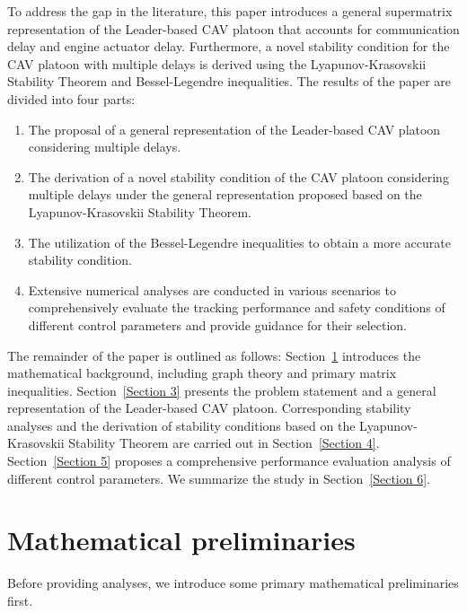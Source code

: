 \documentclass[a4paper]{cas-sc}
\begin{document}
To address the gap in the literature, this paper introduces a general supermatrix representation of the Leader-based CAV platoon that accounts for communication delay and engine actuator delay. Furthermore, a novel stability condition for the CAV platoon with multiple delays is derived using the Lyapunov-Krasovskii Stability Theorem and Bessel-Legendre inequalities. The results of the paper are divided into four parts:
\begin{enumerate}
  \item The proposal of a general representation of the Leader-based CAV platoon considering multiple delays.
  \item The derivation of a novel stability condition of the CAV platoon considering multiple delays under the general representation proposed based on the Lyapunov-Krasovskii Stability Theorem.
  \item The utilization of the Bessel-Legendre inequalities to obtain a more accurate stability condition.
  \item Extensive numerical analyses are conducted in various scenarios to comprehensively evaluate the tracking performance and safety conditions of different control parameters and provide guidance for their selection.
\end{enumerate}

The remainder of the paper is outlined as follows: Section~\ref{Section 2} introduces the mathematical background, including graph theory and primary matrix inequalities. Section~\ref{Section 3} presents the problem statement and a general representation of the Leader-based CAV platoon. Corresponding stability analyses and the derivation of stability conditions based on the Lyapunov-Krasovskii Stability Theorem are carried out in Section~\ref{Section 4}. Section~\ref{Section 5} proposes a comprehensive performance evaluation analysis of different control parameters. We summarize the study in Section~\ref{Section 6}.




\section{Mathematical preliminaries}
\label{Section 2}
Before providing analyses, we introduce some primary mathematical preliminaries first.
\end{document}
